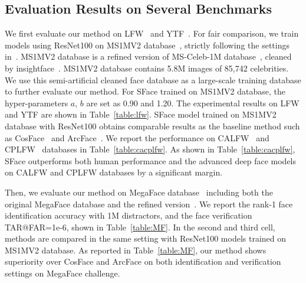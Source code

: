 \documentclass[journal,comsoc]{IEEEtran}
\begin{document}
\subsection{Evaluation Results on Several Benchmarks}
We first evaluate our method on LFW~\cite{LFWTech} and YTF~\cite{Wolf2011Face}. For fair comparison, we train models using ResNet100 on MS1MV2 database~\cite{guo2016msceleb}, strictly following the settings in~\cite{deng2019arcface}. MS1MV2 database is a refined version of MS-Celeb-1M database~\cite{guo2016msceleb}, cleaned by insightface~\cite{deng2019arcface}. MS1MV2 database contains 5.8M images of 85,742 celebrities. We use this semi-artificial cleaned face database as a large-scale training database to further evaluate our method. For SFace trained on MS1MV2 database, the hyper-parameters $a$, $b$ are set as 0.90 and 1.20. The experimental results on LFW and YTF are shown in Table~\ref{table:lfw}. SFace model trained on MS1MV2 database with ResNet100 obtains comparable results as the baseline method such as CosFace~\cite{Wang2018CosFace} and ArcFace~\cite{deng2019arcface}. We report the performance on CALFW~\cite{zheng2017CALFW} and CPLFW~\cite{CPLFWTech} databases in Table~\ref{table:cacplfw}. As shown in Table~\ref{table:cacplfw}, SFace outperforms both human performance and the advanced deep face models on CALFW and CPLFW databases by a significant margin. 

Then, we evaluate our method on MegaFace database~\cite{kemelmacher2016megaface} including both the original MegaFace database and the refined version~\cite{deng2019arcface}. We report the rank-1 face identification accuracy with 1M distractors, and the face verification TAR@FAR=1e-6, shown in Table~\ref{table:MF}. In the second and third cell, methods are compared in the same setting with ResNet100 models trained on MS1MV2 database. As reported in Table~\ref{table:MF}, our method shows superiority over CosFace and ArcFace on both identification and verification settings on MegaFace challenge. 
\end{document}
